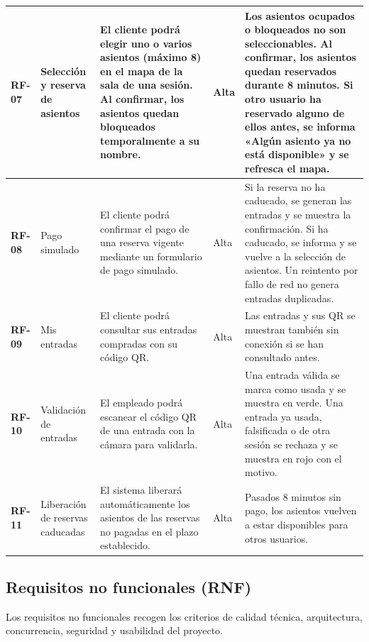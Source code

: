 \documentclass[11pt,a4paper]{article}
\begin{document}
\begin{longtable}{L{1.3cm} L{2.6cm} L{4.6cm} L{1.3cm} L{4.0cm}}
\midrule
\textbf{RF-07} & Selección y reserva de asientos & El cliente podrá elegir uno o varios asientos (máximo 8) en el mapa de la sala de una sesión. Al confirmar, los asientos quedan bloqueados temporalmente a su nombre. & Alta & Los asientos ocupados o bloqueados no son seleccionables. Al confirmar, los asientos quedan reservados durante 8 minutos. Si otro usuario ha reservado alguno de ellos antes, se informa «Algún asiento ya no está disponible» y se refresca el mapa. \\
\midrule
\textbf{RF-08} & Pago simulado & El cliente podrá confirmar el pago de una reserva vigente mediante un formulario de pago simulado. & Alta & Si la reserva no ha caducado, se generan las entradas y se muestra la confirmación. Si ha caducado, se informa y se vuelve a la selección de asientos. Un reintento por fallo de red no genera entradas duplicadas. \\
\midrule
\textbf{RF-09} & Mis entradas & El cliente podrá consultar sus entradas compradas con su código QR. & Alta & Las entradas y sus QR se muestran también sin conexión si se han consultado antes. \\
\midrule
\textbf{RF-10} & Validación de entradas & El empleado podrá escanear el código QR de una entrada con la cámara para validarla. & Alta & Una entrada válida se marca como usada y se muestra en verde. Una entrada ya usada, falsificada o de otra sesión se rechaza y se muestra en rojo con el motivo. \\
\midrule
\textbf{RF-11} & Liberación de reservas caducadas & El sistema liberará automáticamente los asientos de las reservas no pagadas en el plazo establecido. & Alta & Pasados 8 minutos sin pago, los asientos vuelven a estar disponibles para otros usuarios. \\
\end{longtable}

\subsection{Requisitos no funcionales (RNF)}
Los requisitos no funcionales recogen los criterios de calidad técnica, arquitectura, concurrencia, seguridad y usabilidad del proyecto.
\end{document}
